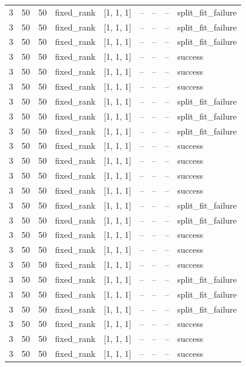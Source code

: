 \begin{longtable}{lllllllll}
3 & 50 & 50 & fixed\_rank & [1, 1, 1] & -- & -- & -- & split\_fit\_failure \\
3 & 50 & 50 & fixed\_rank & [1, 1, 1] & -- & -- & -- & split\_fit\_failure \\
3 & 50 & 50 & fixed\_rank & [1, 1, 1] & -- & -- & -- & split\_fit\_failure \\
3 & 50 & 50 & fixed\_rank & [1, 1, 1] & -- & -- & -- & success \\
3 & 50 & 50 & fixed\_rank & [1, 1, 1] & -- & -- & -- & success \\
3 & 50 & 50 & fixed\_rank & [1, 1, 1] & -- & -- & -- & success \\
3 & 50 & 50 & fixed\_rank & [1, 1, 1] & -- & -- & -- & split\_fit\_failure \\
3 & 50 & 50 & fixed\_rank & [1, 1, 1] & -- & -- & -- & split\_fit\_failure \\
3 & 50 & 50 & fixed\_rank & [1, 1, 1] & -- & -- & -- & split\_fit\_failure \\
3 & 50 & 50 & fixed\_rank & [1, 1, 1] & -- & -- & -- & success \\
3 & 50 & 50 & fixed\_rank & [1, 1, 1] & -- & -- & -- & success \\
3 & 50 & 50 & fixed\_rank & [1, 1, 1] & -- & -- & -- & success \\
3 & 50 & 50 & fixed\_rank & [1, 1, 1] & -- & -- & -- & success \\
3 & 50 & 50 & fixed\_rank & [1, 1, 1] & -- & -- & -- & split\_fit\_failure \\
3 & 50 & 50 & fixed\_rank & [1, 1, 1] & -- & -- & -- & split\_fit\_failure \\
3 & 50 & 50 & fixed\_rank & [1, 1, 1] & -- & -- & -- & success \\
3 & 50 & 50 & fixed\_rank & [1, 1, 1] & -- & -- & -- & success \\
3 & 50 & 50 & fixed\_rank & [1, 1, 1] & -- & -- & -- & success \\
3 & 50 & 50 & fixed\_rank & [1, 1, 1] & -- & -- & -- & split\_fit\_failure \\
3 & 50 & 50 & fixed\_rank & [1, 1, 1] & -- & -- & -- & split\_fit\_failure \\
3 & 50 & 50 & fixed\_rank & [1, 1, 1] & -- & -- & -- & split\_fit\_failure \\
3 & 50 & 50 & fixed\_rank & [1, 1, 1] & -- & -- & -- & success \\
3 & 50 & 50 & fixed\_rank & [1, 1, 1] & -- & -- & -- & success \\
3 & 50 & 50 & fixed\_rank & [1, 1, 1] & -- & -- & -- & success \\

\end{longtable}

